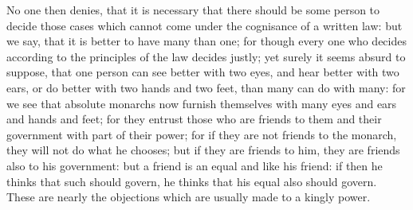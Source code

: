 No one then denies, that it is necessary that there should be some person
to decide those cases which cannot come under the cognisance of a written
law: but we say, that it is better to have many than one; for though every
one who decides according to the principles of the law decides justly; yet
surely it seems absurd to suppose, that one person can see better with two
eyes, and hear better with two ears, or do better with two hands and two
feet, than many can do with many: for we see that absolute monarchs now
furnish themselves with many eyes and ears and hands and feet; for they
entrust those who are friends to them and their government with part of
their power; for if they are not friends to the monarch, they will not do
what he chooses; but if they are friends to him, they are friends also to
his government: but a friend is an equal and like his friend: if then he
thinks that such should govern, he thinks that his equal also should
govern. These are nearly the objections which are usually made to a kingly
power.


